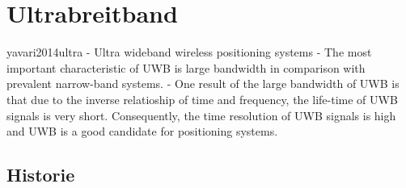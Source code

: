 \begin{comment}
Fragestellung:
- Welche elektrische Beschaltung ist notwendig um das DWM1000 Modul von DecaWave in Betrieb nehmen zu können?
- Wie erfolgt die Entfernungsmessung zwischen den einzelnen UWB--Modulen?
- Wie erfolgt der Datenaustausch zwischen einem UWB--Modul und der Verarbeitungseinheit?
- Kann über die Kalibrierung der Antennenverzögerung eine genauere Entfernungsmessung erreicht werden?
- Wie verändert sich die Genauigkeit der Entfernungsmessung bei einer direkten Sichtverbindung (engl. Line--of--sight (LOS)) und indirekten Sichtverbindung (engl. Non--line--of--sight (NLOS))?
\end{comment}

\chapter{Ultrabreitband}


yavari2014ultra - Ultra wideband wireless positioning systems
	- The most important characteristic of UWB is large bandwidth in comparison with
prevalent narrow-band systems.
	- One result of the large bandwidth of UWB is that due to the inverse relatioship of
time and frequency, the life-time of UWB signals is very short. Consequently, the
time resolution of UWB signals is high and UWB is a good candidate for positioning
systems.



\section{Historie}

